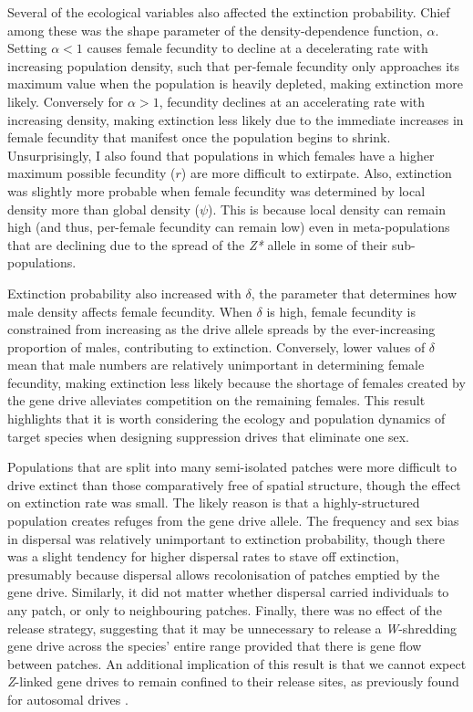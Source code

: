\documentclass[]{rsos}%
\begin{document}
Several of the ecological variables also affected the extinction
probability. Chief among these was the shape parameter of the
density-dependence function, \(\alpha\). Setting \(\alpha < 1\) causes
female fecundity to decline at a decelerating rate with increasing
population density, such that per-female fecundity only approaches its
maximum value when the population is heavily depleted, making extinction
more likely. Conversely for \(\alpha > 1\), fecundity declines at an
accelerating rate with increasing density, making extinction less likely
due to the immediate increases in female fecundity that manifest once
the population begins to shrink. Unsurprisingly, I also found that
populations in which females have a higher maximum possible fecundity
(\(r\)) are more difficult to extirpate. Also, extinction was slightly
more probable when female fecundity was determined by local density more
than global density (\(\psi\)). This is because local density can remain
high (and thus, per-female fecundity can remain low) even in
meta-populations that are declining due to the spread of the \emph{Z*}
allele in some of their sub-populations.

Extinction probability also increased with \(\delta\), the parameter
that determines how male density affects female fecundity. When
\(\delta\) is high, female fecundity is constrained from increasing as
the drive allele spreads by the ever-increasing proportion of males,
contributing to extinction. Conversely, lower values of \(\delta\) mean
that male numbers are relatively unimportant in determining female
fecundity, making extinction less likely because the shortage of females
created by the gene drive alleviates competition on the remaining
females. This result highlights that it is worth considering the ecology
and population dynamics of target species when designing suppression
drives that eliminate one sex.

Populations that are split into many semi-isolated patches were more
difficult to drive extinct than those comparatively free of spatial
structure, though the effect on extinction rate was small. The likely
reason is that a highly-structured population creates refuges from the
gene drive allele. The frequency and sex bias in dispersal was
relatively unimportant to extinction probability, though there was a
slight tendency for higher dispersal rates to stave off extinction,
presumably because dispersal allows recolonisation of patches emptied by
the gene drive. Similarly, it did not matter whether dispersal carried
individuals to any patch, or only to neighbouring patches. Finally,
there was no effect of the release strategy, suggesting that it may be
unnecessary to release a \emph{W}-shredding gene drive across the
species' entire range provided that there is gene flow between patches.
An additional implication of this result is that we cannot expect
\emph{Z}-linked gene drives to remain confined to their release sites,
as previously found for autosomal drives \citep{noble2018cu}.
\end{document}
